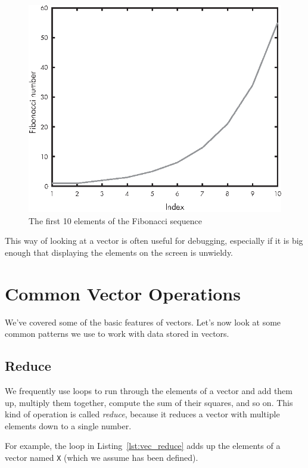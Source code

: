\begin{figure}[H]
\includegraphics{book/images/figure04_01_new_v1.eps}
\caption{The first 10 elements of the Fibonacci sequence}
\label{fig:fibonacci}
\end{figure}

This way of looking at a vector is often useful for debugging, especially
if it is big enough that displaying the elements on
the screen is unwieldy.


\section{Common Vector Operations}

We've covered some of the basic features of vectors. Let's now look at some common patterns we use to work with data stored in vectors.

\subsection{Reduce}
\label{reduce}

We frequently use loops to run through the elements of a vector
and add them up, multiply them together, compute the sum
of their squares, and so on.  This kind of operation is called \emph{reduce},
because it reduces a vector with multiple elements down to a single
number.


For example, the loop in Listing~\ref{lst:vec_reduce} adds up the elements of a vector named \lstinline{X} (which we assume has been defined).

